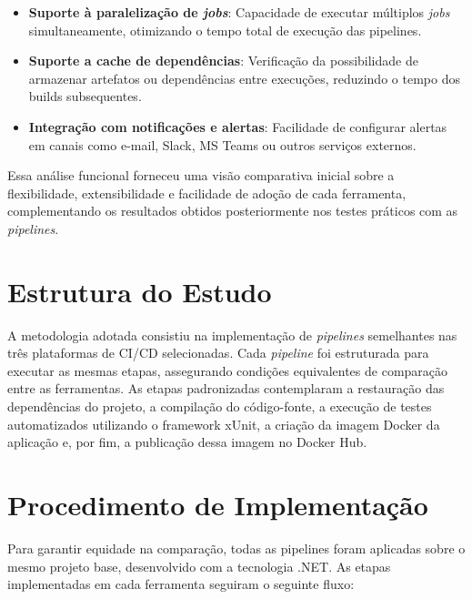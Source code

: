 \begin{itemize}
    \item \textbf{Suporte à paralelização de \textit{jobs}}: Capacidade de executar múltiplos \textit{jobs} simultaneamente, otimizando o tempo total de execução das pipelines.
    
    \item \textbf{Suporte a cache de dependências}: Verificação da possibilidade de armazenar artefatos ou dependências entre execuções, reduzindo o tempo dos builds subsequentes.
    
    \item \textbf{Integração com notificações e alertas}: Facilidade de configurar alertas em canais como e-mail, Slack, MS Teams ou outros serviços externos.
\end{itemize}

Essa análise funcional forneceu uma visão comparativa inicial sobre a flexibilidade, extensibilidade e facilidade de adoção de cada ferramenta, complementando os resultados obtidos posteriormente nos testes práticos com as \textit{pipelines}.

\section{Estrutura do Estudo}

A metodologia adotada consistiu na implementação de \textit{pipelines} semelhantes nas três plataformas de CI/CD selecionadas. Cada \textit{pipeline} foi estruturada para executar as mesmas etapas, assegurando condições equivalentes de comparação entre as ferramentas. As etapas padronizadas contemplaram a restauração das dependências do projeto, a compilação do código-fonte, a execução de testes automatizados utilizando o framework xUnit, a criação da imagem Docker da aplicação e, por fim, a publicação dessa imagem no Docker Hub.

\section{Procedimento de Implementação}

Para garantir equidade na comparação, todas as pipelines foram aplicadas sobre o mesmo projeto base, desenvolvido com a tecnologia .NET. As etapas implementadas em cada ferramenta seguiram o seguinte fluxo:

